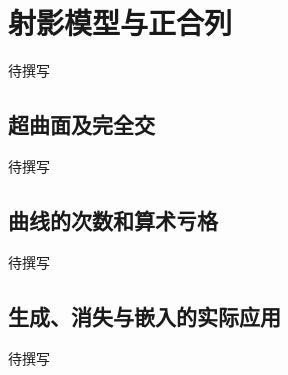 
% 
% 
% 

\section{射影模型与正合列}
\label{g5:sec:1905}

待撰写

\subsection{超曲面及完全交}
\label{g5:subsec:1905:01}
待撰写

\subsection{曲线的次数和算术亏格}
\label{g5:subsec:1905:02}
待撰写

\subsection{生成、消失与嵌入的实际应用}
\label{g5:subsec:1905:03}
待撰写
